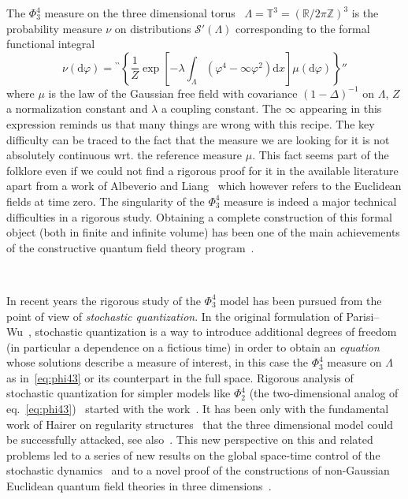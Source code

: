 \documentclass[11pt]{article}
\newcommand{\mathd}{\mathrm{d}}
\newcommand{\tmtextit}[1]{{\itshape{#1}}}
\newcommand{\CS}{\mathscr{S}}
\begin{document}
The $\Phi^4_3$ measure on the three dimensional torus \ $\Lambda =\mathbb{T}^3
= (\mathbb{R}/ 2 \pi \mathbb{Z})^3$ is the probability measure $\nu$ on
distributions $\CS' (\Lambda)$ corresponding to the formal functional integral
\begin{equation}
  \nu (\mathd \varphi) = {}^{\backprime\backprime} \left\{ \frac{1}{Z} \exp
  \left[ - \lambda \int_{\Lambda} (\varphi^4 - \infty \varphi^2) \mathd x
  \right] \mu (\mathd \varphi) \right\}'' \label{eq:phi43}
\end{equation}
where $\mu$ is the law of the Gaussian free field with covariance $(1 -
\Delta)^{- 1}$ on $\Lambda$, $Z$ a normalization constant and $\lambda$ a
coupling constant. The $\infty$ appearing in this expression reminds us that
many things are wrong with this recipe. The key difficulty can be traced to
the fact that the measure we are looking for it is not absolutely continuous
wrt. the reference measure $\mu$. This fact seems part of the folklore even if
we could not find a rigorous proof for it in the available literature apart
from a work of Albeverio and Liang~{\cite{albeverio_remark_2008}} which
however refers to the Euclidean fields at time zero. The singularity of the
$\Phi^4_3$ measure is indeed a major technical difficulties in a rigorous
study. Obtaining a complete construction of this formal object (both in finite
and infinite volume) has been one of the main achievements of the constructive
quantum field theory
program~{\cite{glimm_positivity_1973,feldman_lambda_1974,park_lambda_1975,feldman_wightman_1976,magnen_infinite_1976,benfatto_ultraviolet_1980,brydges_new_1983}}.

\

In recent years the rigorous study of the $\Phi^4_3$ model has been pursued
from the point of view of \tmtextit{stochastic quantization}. In the original
formulation of Parisi--Wu~{\cite{parisi_perturbation_1981}}, stochastic
quantization is a way to introduce additional degrees of freedom (in
particular a dependence on a fictious time) in order to obtain an
\tmtextit{equation} whose solutions describe a measure of interest, in this
case the $\Phi^4_3$ measure on $\Lambda$ as in~{\eqref{eq:phi43}} or its
counterpart in the full space. Rigorous analysis of stochastic quantization
for simpler models like $\Phi^4_2$ (the two-dimensional analog of
eq.~{\eqref{eq:phi43}}) \ started with the
work~{\cite{jona_lasinio_stochastic_1985}}. It has been only with the
fundamental work of Hairer on regularity
structures~{\cite{hairer_theory_2014}} that the three dimensional model could
be successfully attacked, see
also~{\cite{catellier_paracontrolled_2013,kupiainen_renormalization_2016}}.
This new perspective on this and related problems led to a series of new
results on the global space-time control of the stochastic
dynamics~{\cite{MWcomedown,gubinelli_global_2019,albeverio_invariant_2017,moinat_space_time_2018}}
and to a novel proof of the constructions of non-Gaussian Euclidean quantum
field theories in three dimensions~{\cite{gubinelli_pde_2018}}.
\end{document}
